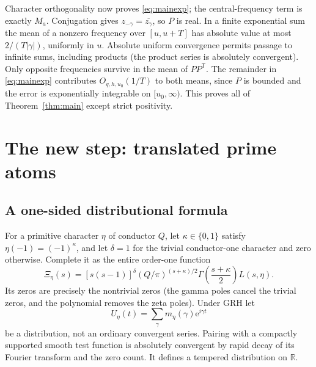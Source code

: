 \documentclass[11pt]{article}
\theoremstyle{remark}\newtheorem{remark}[theorem]{Remark}
\newcommand{\R}{\mathbb R}
\newcommand{\e}{\mathrm e}
\begin{document}
Character orthogonality now proves \eqref{eq:mainexp}; the central-frequency term is exactly $M_a$. Conjugation gives $z_{-\gamma}=\overline{z_\gamma}$, so $P$ is real. In a finite exponential sum the mean of a nonzero frequency over $[u,u+T]$ has absolute value at most $2/(T|\gamma|)$, uniformly in $u$. Absolute uniform convergence permits passage to infinite sums, including products (the product series is absolutely convergent). Only opposite frequencies survive in the mean of $P P^{\mathsf T}$. The remainder in \eqref{eq:mainexp} contributes $O_{q,h,u_0}(1/T)$ to both means, since $P$ is bounded and the error is exponentially integrable on $[u_0,\infty)$. This proves all of Theorem~\ref{thm:main} except strict positivity.

\section{The new step: translated prime atoms}
\subsection{A one-sided distributional formula}
For a primitive character $\eta$ of conductor $Q$, let $\kappa\in\{0,1\}$ satisfy $\eta(-1)=(-1)^\kappa$, and let $\delta=1$ for the trivial conductor-one character and zero otherwise. Complete it as the entire order-one function
\[
 \Xi_\eta(s)=[s(s-1)]^\delta (Q/\pi)^{(s+\kappa)/2}
 \Gamma\left(\frac{s+\kappa}{2}\right)L(s,\eta).
\]
Its zeros are precisely the nontrivial zeros (the gamma poles cancel the trivial zeros, and the polynomial removes the zeta poles). Under GRH let
\[
 U_\eta(t)=\sum_{\gamma}m_\eta(\gamma)\e^{i\gamma t}
\]
be a distribution, not an ordinary convergent series. Pairing with a compactly supported smooth test function is absolutely convergent by rapid decay of its Fourier transform and the zero count. It defines a tempered distribution on $\R$.
\end{document}
